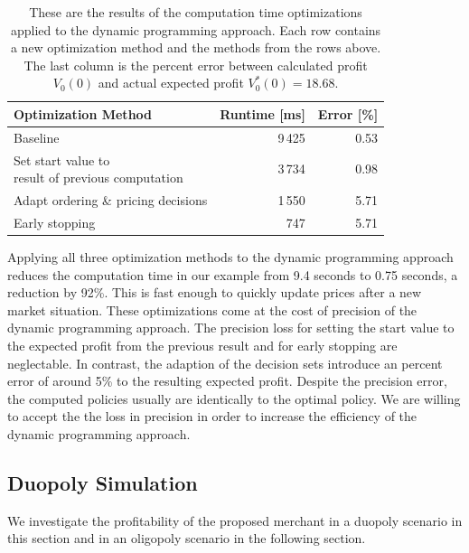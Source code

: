 \begin{table}[t]
	\centering
	\begin{tabular}{ lrr }
		\toprule
		\textbf{Optimization Method} & \textbf{Runtime [ms]} & \textbf{Error [\%]} \\
		\midrule
		Baseline & 9\,425 & 0.53 \\
		\makecell[l]{Set start value to \\ result of previous computation} & 3\,734 & 0.98 \\
		Adapt ordering \& pricing decisions & 1\,550 & 5.71 \\
		Early stopping & 747 & 5.71\\
		\bottomrule
	\end{tabular}
	\caption{These are the results of the computation time optimizations applied to the dynamic programming approach.
	Each row contains a new optimization method and the methods from the rows above. The last column is the percent error between calculated profit $V_0(0)$ and actual expected profit $V^*_0(0) = 18.68$.}
	\label{tab:speedup}
\end{table}

Applying all three optimization methods to the dynamic programming approach reduces the computation time in our example from 9.4 seconds to 0.75 seconds, a reduction by 92\%.
This is fast enough to quickly update prices after a new market situation.
These optimizations come at the cost of precision of the dynamic programming approach.
The precision loss for setting the start value to the expected profit from the previous result and for early stopping are neglectable.
In contrast, the adaption of the decision sets introduce an percent error of around 5\% to the resulting expected profit.
Despite the precision error, the computed policies usually are identically to the optimal policy.
We are willing to accept the the loss in precision in order to increase the efficiency of the dynamic programming approach.

\subsection{Duopoly Simulation}
We investigate the profitability of the proposed merchant in a duopoly scenario in this section and in an oligopoly scenario in the following section.

